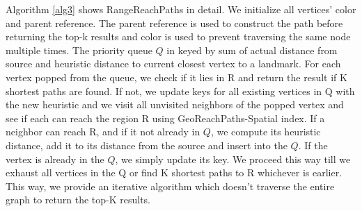 {Algorithm \ref{alg3} shows RangeReachPaths in detail. We initialize all vertices' color and parent reference. The parent reference is used to construct the path before returning the top-k results and color is used to prevent traversing the same node multiple times. The priority queue $Q$ in keyed by sum of actual distance from source and heuristic distance to current closest vertex to a landmark. For each vertex popped from the queue, we check if it lies in R and return the result if K shortest paths are found. If not, we update keys for all existing vertices in Q with the new heuristic and we visit all unvisited neighbors of the popped vertex and see if each can reach the region R using GeoReachPaths-Spatial index. If a neighbor can reach R, and if it not already in $Q$, we compute its heuristic distance, add it to its distance from the source and insert into the $Q$. If the vertex is already in the $Q$, we simply update its key. We proceed this way till we exhaust all vertices in the Q or find K shortest paths to R whichever is earlier. This way, we provide an iterative algorithm which doesn't traverse the entire graph to return the top-K results.

		
		

}

